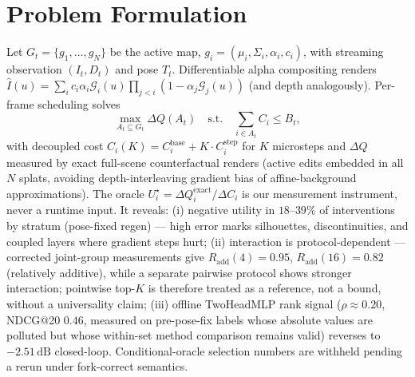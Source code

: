 \documentclass[10pt,twocolumn,letterpaper]{article}
\begin{document}
\section{Problem Formulation}
Let $G_t = \{g_1, \dots, g_N\}$ be the active map, $g_i = (\mu_i, \Sigma_i, \alpha_i, c_i)$, with streaming observation $(I_t, D_t)$ and pose $T_t$.
Differentiable alpha compositing renders
$\hat{I}(u) = \sum_i c_i \alpha_i \mathcal{G}_i(u) \prod_{j<i}(1-\alpha_j \mathcal{G}_j(u))$
(and depth analogously).
Per-frame scheduling solves
\begin{equation}
\max_{A_t \subseteq G_t} \Delta Q(A_t) \quad \text{s.t.} \quad \sum_{i \in A_t} C_i \le B_t,
\end{equation}
with decoupled cost $C_i(K) = C_i^{\mathrm{base}} + K \cdot C_i^{\mathrm{step}}$ for $K$ microsteps and $\Delta Q$ measured by exact full-scene counterfactual renders (active edits embedded in all $N$ splats, avoiding depth-interleaving gradient bias of affine-background approximations).
The oracle $U_i^\star = \Delta Q_i^{\mathrm{exact}} / \Delta C_i$ is our measurement instrument, never a runtime input.
It reveals: (i) negative utility in $18$--$39\%$ of interventions by stratum (pose-fixed regen) --- high error marks silhouettes, discontinuities, and coupled layers where gradient steps hurt; (ii) interaction is protocol-dependent --- corrected joint-group measurements give $R_{\mathrm{add}}(4) = 0.95$, $R_{\mathrm{add}}(16) = 0.82$ (relatively additive), while a separate pairwise protocol shows stronger interaction; pointwise top-$K$ is therefore treated as a reference, not a bound, without a universality claim; (iii) offline TwoHeadMLP rank signal ($\rho \approx 0.20$, NDCG@20 $0.46$, measured on pre-pose-fix labels whose absolute values are polluted but whose within-set method comparison remains valid) reverses to $-2.51\,\mathrm{dB}$ closed-loop. Conditional-oracle selection numbers are withheld pending a rerun under fork-correct semantics.
\end{document}

